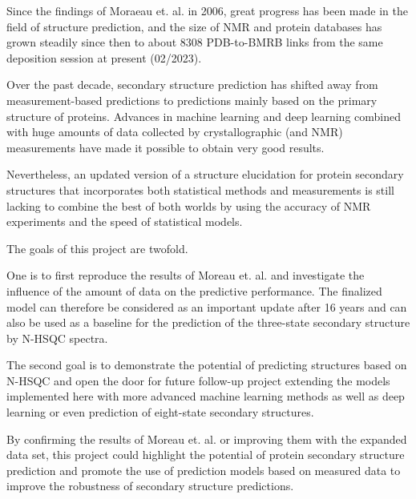\documentclass[11pt]{article}
\begin{document}
Since the findings of Moraeau et. al. in 2006, great progress has been made in the field of structure prediction, and the size of NMR and protein databases has grown steadily since then to about 8308 PDB-to-BMRB links from the same deposition session at present (02/2023).

Over the past decade, secondary structure prediction has shifted away from measurement-based predictions to predictions mainly based on the primary structure of proteins. Advances in machine learning and deep learning combined with huge amounts of data collected by crystallographic (and NMR) measurements have made it possible to obtain very good results.

Nevertheless, an updated version of a structure elucidation for protein secondary structures that incorporates both statistical methods and measurements is still lacking to combine the best of both worlds by using the accuracy of NMR experiments and the speed of statistical models.

The goals of this project are twofold.

One is to first reproduce the results of Moreau et. al. and investigate the influence of the amount of data on the predictive performance.
The finalized model can therefore be considered as an important update after 16 years and can also be used as a baseline for the prediction of the three-state secondary structure by N-HSQC spectra.

The second goal is to demonstrate the potential of predicting structures based on N-HSQC and open the door for future follow-up project extending the models implemented here with more advanced machine learning methods as well as deep learning or even prediction of eight-state secondary structures.

By confirming the results of Moreau et. al. or improving them with the expanded data set, this project could highlight the potential of protein secondary structure prediction and promote the use of prediction models based on measured data to improve the robustness of secondary structure predictions.
\end{document}
